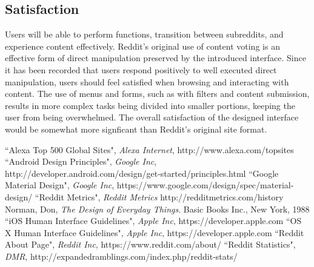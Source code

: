 \documentclass{article}
\begin{document}
\subsection{Satisfaction} Users will be able to perform functions, transition between subreddits, and experience content effectively. Reddit's original use of content voting is an effective form of direct manipulation preserved by the introduced interface. Since it has been recorded that users respond positively to well executed direct manipulation, users should feel satisfied when browsing and interacting with content. The use of menus and forms, such as with filters and content submission, results in more complex tasks being divided into smaller portions, keeping the user from being overwhelmed. The overall satisfaction of the designed interface would be somewhat more signficant than Reddit's original site format.

\clearpage

\begin{thebibliography}{100}

 ``Alexa Top 500 Global Sites", \emph{Alexa Internet}, http://www.alexa.com/topsites
 ``Android Design Principles", \emph{Google Inc}, http://developer.android.com/design/get-started/principles.html
 ``Google Material Design", \emph{Google Inc}, https://www.google.com/design/spec/material-design/
 ``Reddit Metrics", \emph{Reddit Metrics} http://redditmetrics.com/history
 Norman, Don, \emph{The Design of Everyday Things}. Basic Books Inc., New York, 1988
 ``iOS Human Interface Guidelines", \emph{Apple Inc}, https://developer.apple.com
 ``OS X Human Interface Guidelines", \emph{Apple Inc}, https://developer.apple.com
 ``Reddit About Page", \emph{Reddit Inc}, https://www.reddit.com/about/
 ``Reddit Statistics", \emph{DMR}, http://expandedramblings.com/index.php/reddit-stats/

\end{thebibliography}
\end{document}
